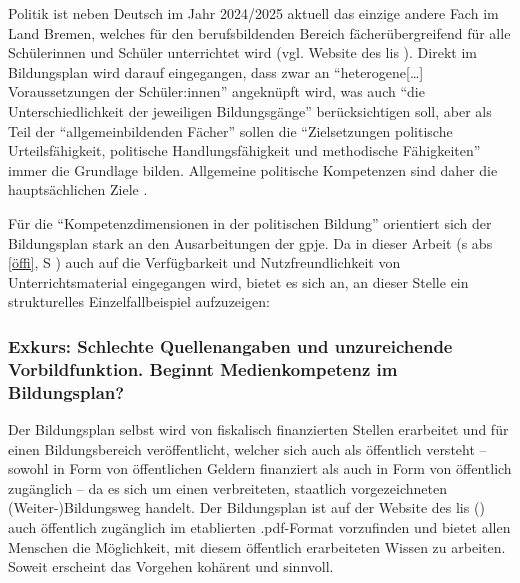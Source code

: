 Politik ist neben Deutsch im Jahr 2024/2025 aktuell das einzige andere Fach im Land Bremen, welches für den berufsbildenden Bereich fächerübergreifend für alle Schülerinnen und Schüler unterrichtet wird (vgl. Website des \gls{lis} \citeyear{LisBildungspläne}). Direkt im Bildungsplan \autocite[][4]{bplan} wird darauf eingegangen, dass zwar an \enquote{heterogene[\dots] Voraussetzungen der Schüler:innen} angeknüpft wird, was auch \enquote{die Unterschiedlichkeit der jeweiligen Bildungsgänge} berücksichtigen soll, aber als Teil der \enquote{allgemeinbildenden Fächer} sollen die \enquote{Zielsetzungen politische Urteilsfähigkeit, politische Handlungsfähigkeit und methodische Fähigkeiten} immer die Grundlage bilden. Allgemeine politische Kompetenzen sind daher die hauptsächlichen Ziele \autocite[9-13]{bplan}.

Für die \enquote{Kompetenzdimensionen in der politischen Bildung} orientiert sich der Bildungsplan stark an den Ausarbeitungen der \gls{gpje}.
Da in dieser Arbeit (\gls{s} \gls{abs} \ref{öffi}, \gls{S} \pageref{öffi}) auch auf die Verfügbarkeit und Nutzfreundlichkeit von Unterrichtsmaterial eingegangen wird, bietet es sich an, an dieser Stelle ein strukturelles Einzelfallbeispiel aufzuzeigen:

\subsubsection{Exkurs: Schlechte Quellenangaben und unzureichende Vorbildfunktion. Beginnt Medienkompetenz im Bildungsplan? \label{gpje}}
Der Bildungsplan selbst wird von fiskalisch finanzierten Stellen erarbeitet und für einen Bildungsbereich veröffentlicht, welcher sich auch als öffentlich versteht -- sowohl in Form von öffentlichen Geldern finanziert als auch in Form von öffentlich zugänglich -- da es sich um einen verbreiteten, staatlich vorgezeichneten \mbox{(Weiter-)Bildungsweg} %
handelt. Der Bildungsplan ist auf der Website des \gls{lis} (\citeyear[]{LisBildungspläne}) auch öffentlich zugänglich im etablierten .pdf-Format vorzufinden und bietet allen Menschen die Möglichkeit, mit diesem öffentlich erarbeiteten Wissen zu arbeiten.
Soweit erscheint das Vorgehen kohärent und sinnvoll.

